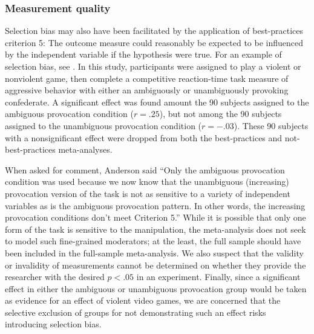 \documentclass[man]{apa6}
\begin{document}
\subsubsection{Measurement quality}
Selection bias may also have been facilitated by the application of best-practices criterion 5: The outcome measure could reasonably be expected to be influenced by the independent variable if the hypothesis were true. For an example of selection bias, see \citet[study 2]{Anderson:etal:2004}. In this study, participants were assigned to play a violent or nonviolent game, then complete a competitive reaction-time task measure of aggressive behavior with either an ambiguously or unambiguously provoking confederate. A significant effect was found amount the 90  subjects assigned to the ambiguous provocation condition ($r = .25$), but not among the 90 subjects assigned to the unambiguous provocation condition ($r = -.03$). These 90 subjects with a nonsignificant effect were dropped from both the best-practices and not-best-practices meta-analyses. 

When asked for comment, Anderson said ``Only the ambiguous provocation condition was used because we now know that the unambiguous (increasing) provocation version of the task is not as sensitive to a variety of independent variables as is the ambiguous provocation pattern. In other words, the increasing provocation conditions don't meet Criterion 5.'' While it is possible that only one form of the task is sensitive to the manipulation, the meta-analysis does not seek to model such fine-grained moderators; at the least, the full sample should have been included in the full-sample meta-analysis. We also suspect that the validity or invalidity of measurements cannot be determined on whether they provide the researcher with the desired $p<.05$ in an experiment. Finally, since a significant effect in either the ambiguous or unambiguous provocation group would be taken as evidence for an effect of violent video games, we are concerned that the selective exclusion of groups for not demonstrating such an effect risks introducing selection bias.
\end{document}
